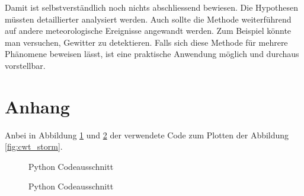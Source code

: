 \begin{refsection}
Damit ist selbstverständlich noch nichts abschliessend bewiesen. Die Hypothesen müssten detaillierter analysiert werden.
Auch sollte die Methode weiterführend auf andere meteorologische Ereignisse angewandt werden.
Zum Beispiel könnte man versuchen, Gewitter zu detektieren.
Falls sich diese Methode für mehrere Phänomene beweisen lässt, ist eine praktische Anwendung möglich und durchaus vorstellbar. 

\section{Anhang}
Anbei in Abbildung \ref{fig:python-plot-code} und \ref{fig:python-plot-code2} der verwendete Code zum Plotten der Abbildung \ref{fig:cwt_storm}.

\begin{figure}[h]
	\centering
	
	\caption{Python Codeausschnitt}
	\label{fig:python-plot-code}
\end{figure}
\begin{figure}[h]
	\centering
	
	\caption{Python Codeausschnitt}
	\label{fig:python-plot-code2}
\end{figure}
 
 \newpage

\printbibliography[heading=subbibliography]
\end{refsection}
